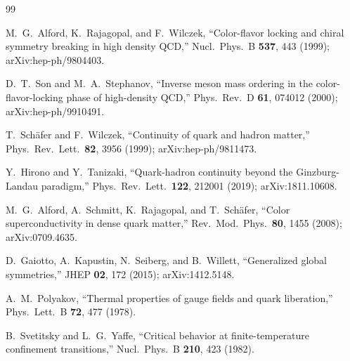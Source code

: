 \documentclass[twocolumn]{revtex4-2}
\begin{document}
\begin{thebibliography}{99}

M.~G.~Alford, K.~Rajagopal, and F.~Wilczek,
``Color-flavor locking and chiral symmetry breaking in high density
QCD,''
Nucl.\ Phys.\ B \textbf{537}, 443 (1999); arXiv:hep-ph/9804403.

D.~T.~Son and M.~A.~Stephanov,
``Inverse meson mass ordering in the color-flavor-locking phase of
high-density QCD,''
Phys.\ Rev.\ D \textbf{61}, 074012 (2000); arXiv:hep-ph/9910491.

T.~Sch\"afer and F.~Wilczek,
``Continuity of quark and hadron matter,''
Phys.\ Rev.\ Lett.\ \textbf{82}, 3956 (1999); arXiv:hep-ph/9811473.

Y.~Hirono and Y.~Tanizaki,
``Quark-hadron continuity beyond the Ginzburg-Landau paradigm,''
Phys.\ Rev.\ Lett.\ \textbf{122}, 212001 (2019); arXiv:1811.10608.

M.~G.~Alford, A.~Schmitt, K.~Rajagopal, and T.~Sch\"afer,
``Color superconductivity in dense quark matter,''
Rev.\ Mod.\ Phys.\ \textbf{80}, 1455 (2008); arXiv:0709.4635.

D.~Gaiotto, A.~Kapustin, N.~Seiberg, and B.~Willett,
``Generalized global symmetries,''
JHEP \textbf{02}, 172 (2015); arXiv:1412.5148.

A.~M.~Polyakov,
``Thermal properties of gauge fields and quark liberation,''
Phys.\ Lett.\ B \textbf{72}, 477 (1978).

B.~Svetitsky and L.~G.~Yaffe,
``Critical behavior at finite-temperature confinement transitions,''
Nucl.\ Phys.\ B \textbf{210}, 423 (1982).

\end{thebibliography}
\end{document}
